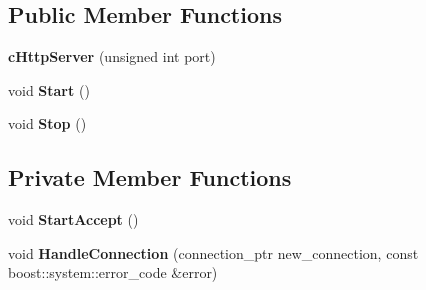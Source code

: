 \subsection*{\-Public \-Member \-Functions}
\begin{DoxyCompactItemize}
\item 
\hypertarget{classhttp__server_1_1cHttpServer_a26d917897dda50502ea1469fb5af9c2e}{{\bfseries c\-Http\-Server} (unsigned int port)}\label{classhttp__server_1_1cHttpServer_a26d917897dda50502ea1469fb5af9c2e}

\item 
\hypertarget{classhttp__server_1_1cHttpServer_ad4699b20627615aee961a06eae97fb89}{void {\bfseries \-Start} ()}\label{classhttp__server_1_1cHttpServer_ad4699b20627615aee961a06eae97fb89}

\item 
\hypertarget{classhttp__server_1_1cHttpServer_a2c7bcb8fb8ca1aa5fe26d00c94c11835}{void {\bfseries \-Stop} ()}\label{classhttp__server_1_1cHttpServer_a2c7bcb8fb8ca1aa5fe26d00c94c11835}

\end{DoxyCompactItemize}
\subsection*{\-Private \-Member \-Functions}
\begin{DoxyCompactItemize}
\item 
\hypertarget{classhttp__server_1_1cHttpServer_abec1513422a3b70b8c3684f4dc8c6271}{void {\bfseries \-Start\-Accept} ()}\label{classhttp__server_1_1cHttpServer_abec1513422a3b70b8c3684f4dc8c6271}

\item 
\hypertarget{classhttp__server_1_1cHttpServer_adfe4c5b575c0e94174a64d228f152d46}{void {\bfseries \-Handle\-Connection} (connection\-\_\-ptr new\-\_\-connection, const boost\-::system\-::error\-\_\-code \&error)}\label{classhttp__server_1_1cHttpServer_adfe4c5b575c0e94174a64d228f152d46}

\end{DoxyCompactItemize}
